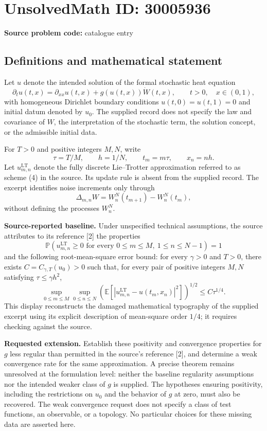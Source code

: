 \documentclass[11pt]{article}
\begin{document}
\section*{UnsolvedMath ID: 30005936}
\textbf{Source problem code:} catalogue entry
\subsection{Definitions and mathematical statement}
Let \(u\) denote the intended solution of the formal stochastic heat equation
\[
\partial_t u(t,x)=\partial_{xx}u(t,x)+g(u(t,x))\dot W(t,x),\qquad t>0,\quad x\in(0,1),
\]
with homogeneous Dirichlet boundary conditions \(u(t,0)=u(t,1)=0\) and initial datum denoted by \(u_0\). The supplied record does not specify the law and covariance of \(W\), the interpretation of the stochastic term, the solution concept, or the admissible initial data.

For \(T>0\) and positive integers \(M,N\), write
\[
\tau=T/M,\qquad h=1/N,\qquad t_m=m\tau,\qquad x_n=nh.
\]
Let \(u^{\mathrm{LT}}_{m,n}\) denote the fully discrete Lie--Trotter approximation referred to as scheme (4) in the source. Its update rule is absent from the supplied record. The excerpt identifies noise increments only through
\[
\Delta_{m,n}W=W_n^N(t_{m+1})-W_n^N(t_m),
\]
without defining the processes \(W_n^N\).

\textbf{Source-reported baseline.} Under unspecified technical assumptions, the source attributes to its reference [2] the properties
\[
\mathbb P\!\left(u^{\mathrm{LT}}_{m,n}\geq0\text{ for every }0\leq m\leq M,\ 1\leq n\leq N-1\right)=1
\]
and the following root-mean-square error bound: for every \(\gamma>0\) and \(T>0\), there exists \(C=C_{\gamma,T}(u_0)>0\) such that, for every pair of positive integers \(M,N\) satisfying \(\tau\leq\gamma h^2\),
\[
\sup_{0\leq m\leq M}\sup_{0\leq n\leq N}
\left(\mathbb E\left[\left|u^{\mathrm{LT}}_{m,n}-u(t_m,x_n)\right|^2\right]\right)^{1/2}
\leq C\tau^{1/4}.
\]
This display reconstructs the damaged mathematical typography of the supplied excerpt using its explicit description of mean-square order \(1/4\); it requires checking against the source.

\textbf{Requested extension.} Establish these positivity and convergence properties for \(g\) less regular than permitted in the source's reference [2], and determine a weak convergence rate for the same approximation. A precise theorem remains unresolved at the formulation level: neither the baseline regularity assumptions nor the intended weaker class of \(g\) is supplied. The hypotheses ensuring positivity, including the restrictions on \(u_0\) and the behavior of \(g\) at zero, must also be recovered. The weak convergence request does not specify a class of test functions, an observable, or a topology. No particular choices for these missing data are asserted here.
\end{document}
